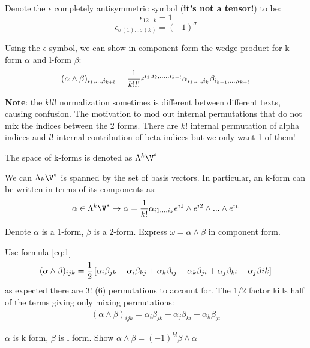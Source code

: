 \documentclass[11pt]{scrartcl}
\begin{document}
\begin{definition}
	Denote the $\epsilon$ completely antisymmetric symbol (\textbf{it's not a tensor!}) to be:
	$$\epsilon_{12...k} = 1$$
	$$\epsilon_{\sigma(1)... \sigma(k)} = (-1)^\sigma$$
\end{definition}

Using the $\epsilon$ symbol, we can show in component form the wedge product for k-form $\alpha$ and l-form $\beta$:
\begin{align} 
	(\alpha \wedge \beta)_{i_1, ..., i_{k+l}} = {1 \over k! l!} \epsilon^{i_1, i_2, .....i_{k+l}} \alpha_{i_1, ..., i_k} \beta_{i_{k+1}, ..., i_{k+l}} \label{eq:1}
\end{align}

\textbf{Note}: the $ k! l!$ normalization sometimes is different between different texts, causing confusion.  The motivation to mod out internal permutations that do not mix the indices between the 2 forms.  There are $k!$ internal permutation of alpha indices and $l!$ internal contribution of beta indices but we only want 1 of them!

\begin{definition}
	The space of k-forms is denoted as $\Lambda^k \V^*$
\end{definition}

We can  $\Lambda_k \V^*$ is spanned by the set of basis vectors.   In particular, an k-form can be written in terms of its components as:
\begin{align}
	\alpha \in \Lambda^k \V^* \rightarrow \alpha = {1 \over k!} \alpha_{i1, ... i_k} e^{i1} \wedge e^{i2} \wedge ... \wedge e^{i_k} \label{eq:2}
\end{align}

\begin{problem} Denote $\alpha$ is a 1-form, $\beta$ is a 2-form.  Express $\omega = \alpha \wedge \beta$ in component form.
\end{problem}
Use formula \ref{eq:1}
$$ (\alpha \wedge \beta)_{ijk} = {1 \over 2} \left[\alpha_i \beta_{jk} - \alpha_{i} \beta_{kj} + \alpha_k \beta_{ij} - \alpha_{k} \beta_{ji} + \alpha_j \beta_{ki} - \alpha_j \beta{ik} \right]$$
as expected there are 3! (6) permutations to account for.
The 1/2 factor kills half of the terms giving only mixing permutations:
\begin{align}
	(\alpha \wedge \beta)_{ijk} = \alpha_i \beta_{jk} + \alpha_j \beta_{ki} + \alpha_k \beta_{ji}
\end{align}

\begin{problem}
	$\alpha$ is k form, $\beta$ is l form.
	Show $\alpha \wedge \beta = (-1)^{kl} \beta \wedge \alpha$
\end{problem}
\end{document}
